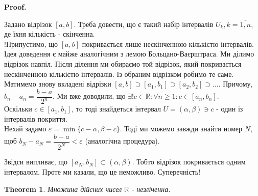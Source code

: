 \documentclass[a4paper, 14pt]{article}
\makeatletter
\def\qed{$\blacksquare$}
\theoremstyle{theoremdd}
\newtheorem{theorem}{Theorem}[subsection]
\theoremstyle{theoremdd}
\theoremstyle{theoremdd}
\theoremstyle{theoremdd}
\theoremstyle{theoremdd}
\theoremstyle{theoremdd}
\theoremstyle{theoremdd}
\theoremstyle{theoremdd}
\renewenvironment{proof}[1][Proof.\\]{\par
\pushQED{\hfill \qed}%
\normalfont \topsep6\p@\@plus6\p@\relax
\trivlist
\item\relax
{\bfseries
#1\@addpunct{.}}\hspace\labelsep\ignorespaces
}{%
\popQED\endtrivlist\@endpefalse
}
\makeatother
\begin{document}
	\begin{proof}
	Задано відрізок $[a,b]$. Треба довести, що є такий набір інтервалів $U_k, k = \overline{1,n}$, де їхня кількість - скінченна.\\
	!Припустимо, що $[a,b]$ покривається лише нескінченною кількістю інтервалів. \\ 
	Ідея доведення є майже аналогічним з лемою Больцано-Ваєрштраса. Ми ділимо відрізок навпіл. Після ділення ми обираємо той відрізок, який покривається нескінченною кількістю інтервалів. Із обраним відрізком робимо те саме.\\
	Матимемо знову вкладені відрізки $[a,b] \supset [a_1,b_1] \supset [a_2,b_2] \supset \dots$. Причому, $b_n - a_n = \dfrac{b-a}{2^n}$. Ми вже доводили, що $\exists! c \in \mathbb{R}: \forall n \geq 1: c \in [a_n,b_n]$.\\
	Оскільки $c \in [a_1,b_1]$, то тоді знайдеться інтервал $U = (\alpha,\beta) \ni c$ - один із інтервалів покриття.\\
	Нехай задамо $\varepsilon = \min \{ c-\alpha, \beta-c \}$. Тоді ми можемо завжди знайти номер $N$, щоб $b_N - a_N = \dfrac{b-a}{2^N} < \varepsilon$ (аналогічна процедура).
	\begin{figure}[H]
	\centering
	\end{figure}
	Звідси випливає, що $[a_N,b_N] \subset (\alpha, \beta)$. Тобто відрізок покривається одним інтервалом. Проте ми казали, що це неможливо. Суперечність!
	\end{proof}
		
	\begin{theorem}
	Множина дійсних чисел $\mathbb{R}$ - незліченна.
	\end{theorem}
	
\end{document}
